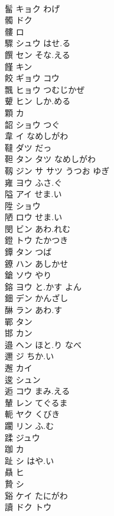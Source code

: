 \documentclass[8pt]{extreport}
\begin{document}
\begin{CJK}{UTF8}{min}
\\	髷	キョク わげ			
\\	髑	ドク			
\\	髏	ロ			
\\	驟	シュウ はせ.る			
\\	饌	セン そな.える			
\\	饉	キン			
\\	餃	ギョウ コウ			
\\	飄	ヒョウ つむじかぜ			
\\	顰	ヒン しか.める			
\\	顆	カ			
\\	韶	ショウ つぐ			
\\	韋	イ なめしがわ			
\\	韃	ダツ だっ			
\\	靼	タン タツ なめしがわ			
\\	靱	ジン サ サツ うつお ゆぎ			
\\	雍	ヨウ ふさ.ぐ			
\\	隘	アイ せま.い			
\\	陞	ショウ			
\\	陋	ロウ せま.い			
\\	閔	ビン あわ.れむ			
\\	鐙	トウ たかつき			
\\	鐔	タン つば			
\\	鐐	ハン あしかせ			
\\	鎗	ソウ やり			
\\	鎔	ヨウ と.かす よん			
\\	鈿	デン かんざし			
\\	醂	ラン あわ.す			
\\	鄲	タン			
\\	邯	カン			
\\	邉	ヘン ほと.り なべ					
\\	邇	ジ ちか.い			
\\	邂	カイ			
\\	逡	シュン			
\\	逅	コウ まみ.える			
\\	輦	レン てぐるま			
\\	軛	ヤク くびき			
\\	躙	リン ふ.む			
\\	蹂	ジュウ			
\\	跏	カ			
\\	趾	シ はや.い			
\\	贔	ヒ			
\\	贄	シ			
\\	谿	ケイ たにがわ			
\\	讀	ドク トウ					

\end{CJK}
\end{document}
